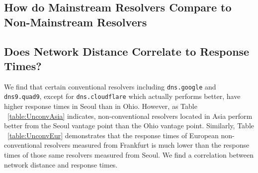 \subsection{How do Mainstream Resolvers Compare to Non-Mainstream Resolvers}


\subsection{Does Network Distance Correlate to Response Times?}

We find that certain conventional resolvers including \texttt{dns.google} and \texttt{dns9.quad9}, except for \texttt{dns.cloudflare} which actually performs better, have higher response times in Seoul than in Ohio. 
However, as Table ~\ref{table:UnconvAsia} indicates, non-conventional resolvers located in Asia perform better from the Seoul vantage point than the Ohio vantage point. 
Similarly, Table ~\ref{table:UnconvEur} demonstrates that the response times of European non-conventional resolvers measured from Frankfurt is much lower than the response times of those same resolvers measured from Seoul. 
We find a correlation between network distance and response times. 





















